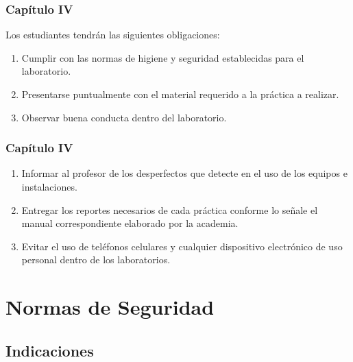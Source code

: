 \documentclass[14pt]{beamer}
\begin{document}
\begin{frame}
\frametitle{Capítulo IV}
 Los estudiantes tendrán las siguientes obligaciones:
\pause
{}
\begin{enumerate}[<+->]
\item Cumplir con las normas de higiene y seguridad establecidas para el laboratorio.
\item Presentarse puntualmente con el material requerido a la práctica a realizar.
\item Observar buena conducta dentro del laboratorio.
\seti
\end{enumerate}
\end{frame}
\begin{frame}
\frametitle{Capítulo IV}
\begin{enumerate}[<+->]
\conti
\item Informar al profesor de los desperfectos que detecte en el uso de los equipos e instalaciones.
\item Entregar los reportes necesarios de cada práctica conforme lo señale el manual correspondiente elaborado por la academia.
\item Evitar el uso de teléfonos celulares y cualquier dispositivo electrónico de uso personal dentro de los laboratorios.
\end{enumerate}
\end{frame}

\section{Normas de Seguridad}
\subsection{Indicaciones}
\end{document}
